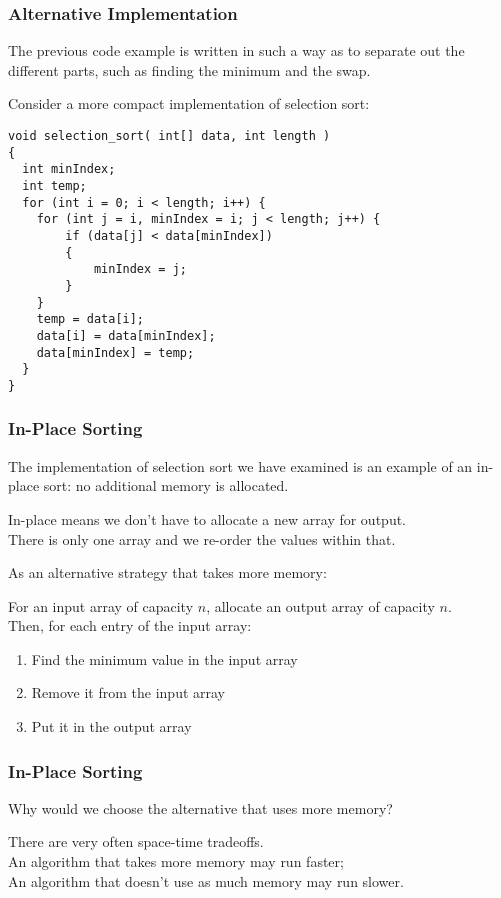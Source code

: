 \begin{frame}[fragile]
\frametitle{Alternative Implementation}
The previous code example is written in such a way as to separate out the different parts, such as finding the minimum and the swap.

Consider a more compact implementation of selection sort:
\vspace{-1em}
{\scriptsize
\begin{verbatim}
void selection_sort( int[] data, int length )
{
  int minIndex;
  int temp;
  for (int i = 0; i < length; i++) {
    for (int j = i, minIndex = i; j < length; j++) {
        if (data[j] < data[minIndex])
        {
            minIndex = j;
        }
    }
    temp = data[i];
    data[i] = data[minIndex];
    data[minIndex] = temp;
  }
}
\end{verbatim}
}

\end{frame}


\begin{frame}
\frametitle{In-Place Sorting}

The implementation of selection sort we have examined is an example of an \alert{in-place} sort: no additional memory is allocated.

In-place means we don't have to allocate a new array for output.\\
\quad There is only one array and we re-order the values within that.

As an alternative strategy that takes more memory: 

For an input array of capacity $n$, allocate an output array of capacity $n$.\\
Then, for each entry of the input array: 
\begin{enumerate}
\item Find the minimum value in the input array
\item Remove it from the input array
\item Put it in the output array
\end{enumerate}

\end{frame}

\begin{frame}
\frametitle{In-Place Sorting}

Why would we choose the alternative that uses more memory?

There are very often space-time tradeoffs.\\
\quad An algorithm that takes more memory may run faster; \\
\quad An algorithm that doesn't use as much memory may run slower.

\end{frame}




